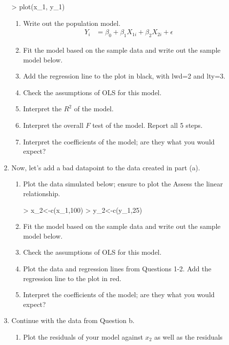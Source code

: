 \documentclass{article}
\begin{document}
\begin{enumerate}
\begin{enumerate}
\begin{Schunk}
\begin{Sinput}
> plot(x_1, y_1)
\end{Sinput}
\end{Schunk}
\begin{enumerate}
    \item Write out the population model.
    \begin{align*}
      Y_i &= \beta_0 + \beta_1 X_{1i} + \beta_2 X_{2i} + \epsilon 
    \end{align*}
    \item Fit the model based on the sample data and write out the sample model below.
    \item Add the regression line to the plot in black, with lwd=2 and lty=3.
    \item Check the assumptions of OLS for this model.
    \item Interpret the $R^2$ of the model.
    \item Interpret the overall $F$ test of the model. Report all 5 steps.
    \item Interpret the coefficients of the model; are they what you would expect?
\end{enumerate}
  \item Now, let's add a bad datapoint to the data created in part (a).
  \begin{enumerate}
    \item Plot the data simulated below; ensure to plot the  Assess the linear relationship.
\begin{Schunk}
\begin{Sinput}
> x_2<-c(x_1,100)
> y_2<-c(y_1,25)
\end{Sinput}
\end{Schunk}
    \item Fit the model based on the sample data and write out the sample model below.
    \item Check the assumptions of OLS for this model.
    \item Plot the data and regression lines from Questions 1-2. Add the regression line to the 
    plot in red.
    \item Interpret the coefficients of the model; are they what you would expect?
\end{enumerate}
  \item Continue with the data from Question b.
\begin{enumerate}
    \item Plot the residuals of your model against $x_2$ as well as the residuals 

\end{enumerate}
\end{enumerate}
\end{enumerate}
\end{document}
